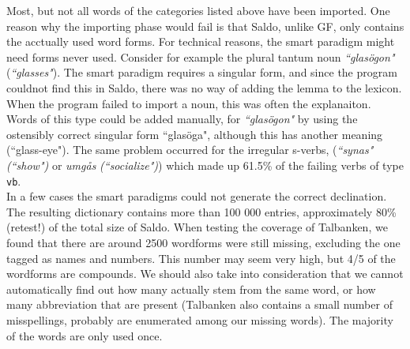 \documentclass{report}
\begin{document}
%
Most, but not all words of the categories listed above have been imported.
One reason why the importing phase would fail 
is that Saldo, unlike GF, only contains the acctually used word forms.
For technical reasons, the smart paradigm might need forms never used.
Consider for example
the plural tantum %
noun \emph{``glasögon"} (\emph{``glasses"}).
The smart paradigm requires a singular form, and since the program couldnot
find this in Saldo, there was no way of adding the lemma to the lexicon. 
When the program failed to import a noun, this was often the explanaiton.
Words of this type could be added manually, for \emph{``glasögon"} by using the
ostensibly correct singular form ``glasöga", although this
has another meaning (``glass-eye").
The same problem occurred for the irregular s-verbs,
(\emph{``synas"} \emph{(``show")} or \emph{umgås} \emph{(``socialize")})
which made up 61.5\% of the failing verbs of type \verb_vb_.\\
In a few cases the smart paradigms could not generate the correct declination.\\


The resulting dictionary contains more than 100 000 entries, approximately 80\% (retest!)
of the total size of Saldo.
When testing the coverage of Talbanken,
we found that there are around 2500 wordforms were still missing, excluding the one
tagged as names and numbers. This number may seem very high, but %
4/5 of the wordforms are compounds. We should also take into consideration that 
we cannot automatically find out how many actually stem from the same word, or
how many abbreviation that are present (Talbanken also contains a small number of 
misspellings, probably are enumerated among our missing words). The majority
of the words are only used once.\\
\end{document}
